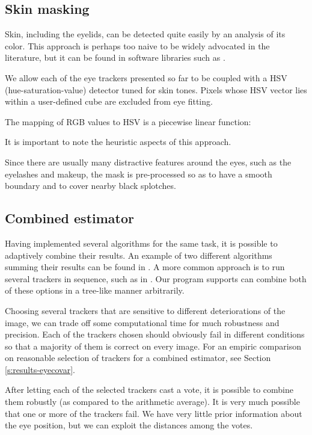 \subsection{Skin masking}

Skin, including the eyelids, can be detected quite easily by an analysis of its color.
This approach is perhaps too naive to be widely advocated in the literature, but it can be found in software libraries such as \cite{deepgaze}.

We allow each of the eye trackers presented so far to be coupled with a HSV (hue-saturation-value) detector tuned for skin tones.
Pixels whose HSV vector lies within a user-defined cube are excluded from eye fitting.

The mapping of RGB values to HSV is a piecewise linear function:

It is important to note the heuristic aspects of this approach.

Since there are usually many distractive features around the eyes, such as the eyelashes and makeup, the mask is pre-processed so as to have a smooth boundary and to cover nearby black splotches.


\subsection{Combined estimator}

Having implemented several algorithms for the same task, it is possible to adaptively combine their results.
An example of two different algorithms summing their results can be found in \cite{leo14}.
A more common approach is to run several trackers in sequence, such as in \cite{wang16,george16,zhu12}.
Our program supports can combine both of these options in a tree-like manner arbitrarily.

Choosing several trackers that are sensitive to different deteriorations of the image, we can trade off some computational time for much robustness and precision.
Each of the trackers chosen should obviously fail in different conditions so that a majority of them is correct on every image.
For an empiric comparison on reasonable selection of trackers for a combined estimator, see Section \ref{s:results-eyecovar}.

After letting each of the selected trackers cast a vote, it is possible to combine them robustly (as compared to the arithmetic average).
It is very much possible that one or more of the trackers fail.
We have very little prior information about the eye position, but we can exploit the distances among the votes.

